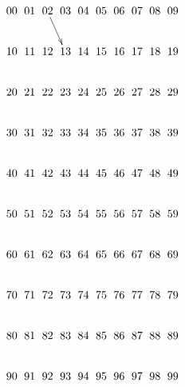 \documentclass[a4paper]{article}
\begin{document}

$$\xymatrix @C=0pt {
00 & 01 & 02 \ar[dr] & 03 & 04 & 05 & 06 & 07 & 08 & 09 \\
10 & 11 & 12 & 13 & 14 & 15 & 16 & 17 & 18 & 19 \\
20 & 21 & 22 & 23 & 24 & 25 & 26 & 27 & 28 & 29 \\
30 & 31 & 32 & 33 & 34 & 35 & 36 & 37 & 38 & 39 \\
40 & 41 & 42 & 43 & 44 & 45 & 46 & 47 & 48 & 49 \\
50 & 51 & 52 & 53 & 54 & 55 & 56 & 57 & 58 & 59 \\
60 & 61 & 62 & 63 & 64 & 65 & 66 & 67 & 68 & 69 \\
70 & 71 & 72 & 73 & 74 & 75 & 76 & 77 & 78 & 79 \\
80 & 81 & 82 & 83 & 84 & 85 & 86 & 87 & 88 & 89 \\
90 & 91 & 92 & 93 & 94 & 95 & 96 & 97 & 98 & 99 \\
}$$

\end{document}
